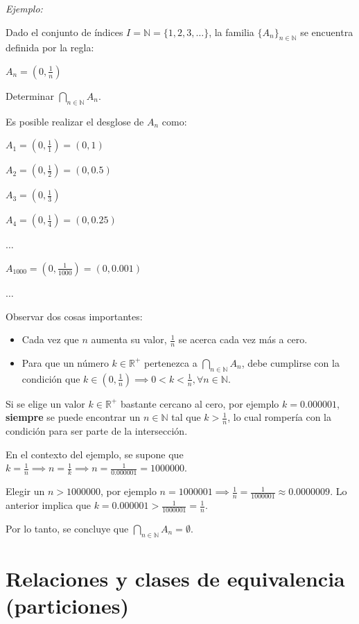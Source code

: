\documentclass{article}
\begin{document}
\textit{Ejemplo:}

Dado el conjunto de índices $I = \mathbb{N} = \{1, 2, 3, \dots\}$, la familia $\{A_n\}_{n \in \mathbb{N}}$ se encuentra definida por la regla:

$A_n = (0, \frac{1}{n})$

Determinar $\bigcap_{n \in \mathbb{N}} A_n$.

Es posible realizar el desglose de $A_n$ como:

$A_1 = (0, \frac{1}{1}) = (0, 1)$

$A_2 = (0, \frac{1}{2}) = (0, 0.5)$

$A_3 = (0, \frac{1}{3})$

$A_4 = (0, \frac{1}{4}) = (0, 0.25)$

$\dots$

$A_{1000} = (0, \frac{1}{1000}) = (0, 0.001)$

$\dots$

Observar dos cosas importantes:

\begin{itemize}
    \item Cada vez que $n$ aumenta su valor, $\frac{1}{n}$ se acerca cada vez más a cero.
    \item Para que un número $k \in \mathbb{R}^+$ pertenezca a $\bigcap_{n \in \mathbb{N}} A_n$, debe cumplirse con la condición que $k \in (0, \frac{1}{n}) \implies 0 < k < \frac{1}{n}, \forall n \in \mathbb{N}$.
\end{itemize}

Si se elige un valor $k \in \mathbb{R}^+$ bastante cercano al cero, por ejemplo $k = 0.000001$, \textbf{siempre} se puede encontrar un $n \in \mathbb{N}$ tal que $k > \frac{1}{n}$, lo cual rompería con la condición para ser parte de la intersección.

En el contexto del ejemplo, se supone que $k = \frac{1}{n} \implies n = \frac{1}{k} \implies n = \frac{1}{0.000001} = 1000000$.

Elegir un $n > 1000000$, por ejemplo $n = 1000001 \implies \frac{1}{n} = \frac{1}{1000001} \approx 0.0000009$. Lo anterior implica que $k = 0.000001 > \frac{1}{1000001} = \frac{1}{n}$.

Por lo tanto, se concluye que $\bigcap_{n \in \mathbb{N}} A_n = \emptyset$. 

\appendix

\section{Relaciones y clases de equivalencia (particiones)}
\end{document}

